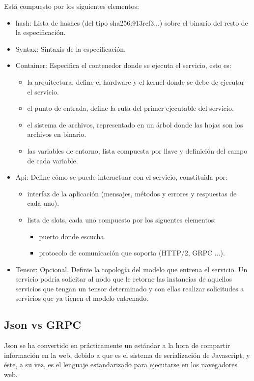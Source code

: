 \documentclass[11pt]{article}
\begin{document}
			Está compuesto por los siguientes elementos:
			\begin{itemize}
				\item hash: Lista de hashes (del tipo sha256:913ref3...) sobre el binario del resto de la especificación.
				\item Syntax: Sintaxis de la especificación.
				\item Container: Especifica el contenedor donde se ejecuta el servicio, esto es:
					\begin{itemize}
						\item la arquitectura, define el hardware y el kernel donde se debe de ejecutar el servicio.
						\item el punto de entrada, define la ruta del primer ejecutable del servicio.
						\item el sistema de archivos, representado en un árbol donde las hojas son los archivos en binario.
						\item las variables de entorno, lista compuesta por llave y definición del campo de cada variable. 
					\end{itemize} 
				\item Api: Define cómo se puede interactuar con el servicio, constituida por:
					\begin{itemize}
						\item interfaz de la aplicación (mensajes, métodos y errores y respuestas de cada uno).
						\item lista de slots, cada uno compuesto por los siguentes elementos:
							\begin{itemize}
								\item puerto donde escucha.
								\item protocolo de comunicación que soporta (HTTP/2, GRPC ...).
							\end{itemize}
					\end{itemize} 
				\item Tensor: Opcional. Definie la topología del modelo que entrena el servicio. Un servicio podría solicitar al nodo que le retorne las instancias
					de aquellos servicios que tengan un tensor determinado y con ellas realizar solicitudes a servicios que ya tienen el modelo entrenado.
			\end{itemize}
		\subsection{Json vs GRPC} 
			Json se ha convertido en prácticamente un estándar a la hora de compartir información en la web, debido a que es el sistema de serialización de Javascript, y éste, a su vez,
			es el lenguaje estandarizado para ejecutarse en los navegadores web. \\
\end{document}

